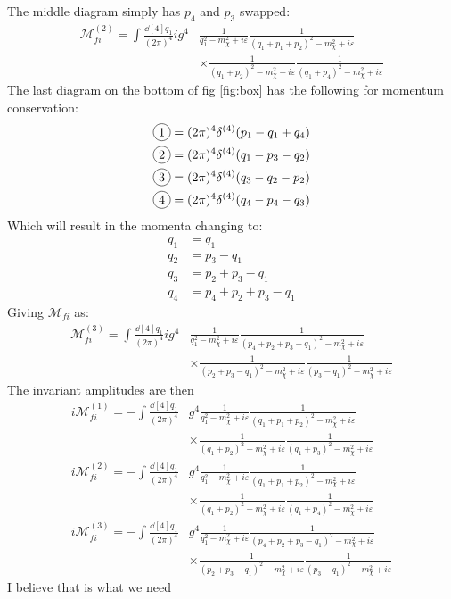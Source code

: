 \documentclass[12pt]{article}
\newcommand{\veps}{\varepsilon}
\newcommand{\circled}[1]{\tikz[baseline=(char.base)]{
    \node[shape=circle,draw,inner sep=2pt](char){#1};}}
\begin{document}
The middle diagram simply has $p_4$ and $p_3$ swapped:
\begin{align*}
  \mathcal{M}_{fi}^{(2)}=
  \int \frac{\dd[4]{q_1}}{(2\pi)^4}ig^4&
  \frac1{q_1^2-m_\chi^2+i\veps}\frac1{(q_1+p_1+p_2)^2-m_\chi^2+i\veps}\\
  &\times\frac1{(q_1+p_2)^2-m_\chi^2+i\veps}\frac1{(q_1+p_4)^2-m_\chi^2+i\veps}
\end{align*}
The last diagram on the bottom of fig \ref{fig:box} has the following for momentum conservation:
\begin{align*}
  \circled{1}=(2\pi)^4\delta^{(4)}(p_1-q_1+q_4)\\
  \circled{2}=(2\pi)^4\delta^{(4)}(q_1-p_3-q_2)\\
  \circled{3}=(2\pi)^4\delta^{(4)}(q_3-q_2-p_2)\\
  \circled{4}=(2\pi)^4\delta^{(4)}(q_4-p_4-q_3)
\end{align*}
Which will result in the momenta changing to:
\begin{align*}
    q_1&=q_1\\
    q_2&=p_3-q_1\\
    q_3&=p_2+p_3-q_1\\
    q_4&=p_4+p_2+p_3-q_1
\end{align*}
Giving $\mathcal{M}_{fi}$ as:
\begin{align*}
  \mathcal{M}_{fi}^{(3)}=
  \int \frac{\dd[4]{q_1}}{(2\pi)^4}ig^4&
  \frac1{q_1^2-m_\chi^2+i\veps}\frac1{(p_4+p_2+p_3-q_1)^2-m_\chi^2+i\veps}\\
  &\times\frac1{(p_2+p_3-q_1)^2-m_\chi^2+i\veps}\frac1{(p_3-q_1)^2-m_\chi^2+i\veps}
\end{align*}
The invariant amplitudes are then
\begin{equation}
    \boxed{\begin{aligned}
    i\mathcal{M}_{fi}^{(1)}=
    -\int\frac{\dd[4]{q_1}}{(2\pi)^4}&g^4
    \frac1{q_1^2-m_\chi^2+i\veps}\frac1{(q_1+p_1+p_2)^2-m_\chi^2+i\veps}\\
    &\times\frac1{(q_1+p_2)^2-m_\chi^2+i\veps}\frac1{(q_1+p_3)^2-m_\chi^2+i\veps}\\
    i\mathcal{M}_{fi}^{(2)}=
    -\int\frac{\dd[4]{q_1}}{(2\pi)^4}&g^4
    \frac1{q_1^2-m_\chi^2+i\veps}\frac1{(q_1+p_1+p_2)^2-m_\chi^2+i\veps}\\
    &\times\frac1{(q_1+p_2)^2-m_\chi^2+i\veps}\frac1{(q_1+p_4)^2-m_\chi^2+i\veps}\\
    i\mathcal{M}_{fi}^{(3 )}=
    -\int\frac{\dd[4]{q_1}}{(2\pi)^4}&g^4
    \frac1{q_1^2-m_\chi^2+i\veps}\frac1{(p_4+p_2+p_3-q_1)^2-m_\chi^2+i\veps}\\
    &\times\frac1{(p_2+p_3-q_1)^2-m_\chi^2+i\veps}\frac1{(p_3-q_1)^2-m_\chi^2+i\veps}
    \end{aligned}}
\end{equation}
I believe that is what we need
\end{document}
